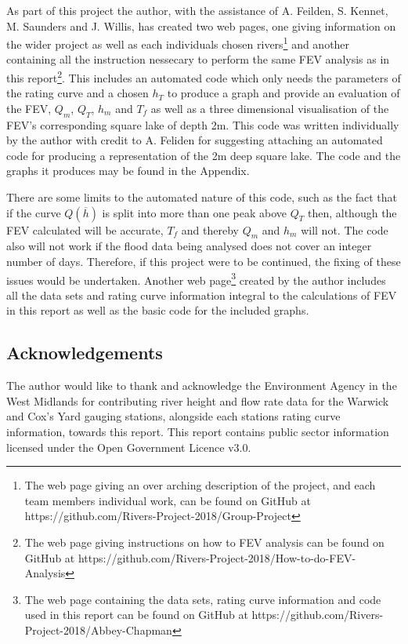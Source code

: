 \documentclass[11pt,a4paper]{article}
\begin{document}
As part of this project the author, with the assistance of A. Feilden, S. Kennet, M. Saunders and J. Willis, has created two web pages, one giving information on the wider project as well as each individuals chosen rivers\footnote{The web page giving an over arching description of the project, and each team members individual work, can be found on GitHub at https://github.com/Rivers-Project-2018/Group-Project} and another  containing all the instruction nessecary to perform the same FEV analysis as in this report\footnote{The web page giving instructions on how to FEV analysis can be found on GitHub at https://github.com/Rivers-Project-2018/How-to-do-FEV-Analysis}. This includes an automated code which only needs the parameters of the rating curve and a chosen $h_T$ to produce a graph and provide an evaluation of the FEV, $Q_m$, $Q_T$, $h_m$ and $T_f$ as well as a three dimensional visualisation of the FEV's corresponding square lake of depth 2m. This code was written individually by the author with credit to A. Feliden for suggesting attaching an automated code for producing a representation of the 2m deep square lake. The code and the graphs it produces may be found in the Appendix. 

There are some limits to the automated nature of this code, such as the fact that if the curve $Q(\overline{h})$ is split into more than one peak above $Q_T$ then, although the FEV calculated will be accurate, $T_f$ and thereby $Q_m$ and $h_m$ will not. The code also will not work if the flood data being analysed does not cover an integer number of days. Therefore, if this project were to be continued, the fixing of these issues would be undertaken. Another web page\footnote{The web page containing the data sets, rating curve information and code used in this report can be found on GitHub at https://github.com/Rivers-Project-2018/Abbey-Chapman} created by the author includes all the data sets and rating curve information integral to the calculations of FEV in this report as well as the basic code for the included graphs.

\subsection{Acknowledgements}
The author would like to thank and acknowledge the Environment Agency in the West Midlands for contributing river height and flow rate data for the Warwick and Cox's Yard gauging stations, alongside each stations rating curve information, towards this report. This report contains public sector information licensed under the Open Government Licence v3.0.
\end{document}
